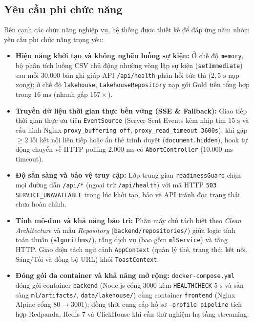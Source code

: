 \subsection{Yêu cầu phi chức năng}
\label{sec:nfr}
Bên cạnh các chức năng nghiệp vụ, hệ thống được thiết kế để đáp ứng năm nhóm yêu cầu phi chức năng trọng yếu:
\begin{itemize}[topsep=0pt, itemsep=1pt]
	\item \textbf{Hiệu năng khởi tạo và không nghẽn luồng sự kiện:} Ở chế độ \texttt{memory}, bộ phân tích luồng CSV chủ động nhường vòng lặp sự kiện (\texttt{setImmediate}) sau mỗi $30.000$ bản ghi giúp API \texttt{/api/health} phản hồi tức thì ($2{,}5\text{ s}$ nạp xong); ở chế độ \texttt{lakehouse}, \texttt{LakehouseRepository} nạp gói Gold tiền tổng hợp trong $16\text{ ms}$ (nhanh gấp $157\times$).
	\item \textbf{Truyền dữ liệu thời gian thực bền vững (SSE \& Fallback):} Giao tiếp thời gian thực ưu tiên \texttt{EventSource} (Server-Sent Events kèm nhịp tim $15\text{ s}$ và cấu hình Nginx \texttt{proxy_buffering off}, \texttt{proxy_read_timeout 3600s}); khi gặp $\ge 2$ lỗi kết nối liên tiếp hoặc ẩn thẻ trình duyệt (\texttt{document.hidden}), hook tự động chuyển về HTTP polling $2.000\text{ ms}$ có \texttt{AbortController} ($10.000\text{ ms}$ timeout).
	\item \textbf{Độ sẵn sàng và bảo vệ truy cập:} Lớp trung gian \texttt{readinessGuard} chặn mọi đường dẫn \texttt{/api/*} (ngoại trừ \texttt{/api/health}) với mã HTTP \texttt{503 SERVICE_UNAVAILABLE} trong lúc khởi tạo, bảo vệ API tránh đọc trạng thái chưa hoàn chỉnh.
	\item \textbf{Tính mô-đun và khả năng bảo trì:} Phần máy chủ tách biệt theo \textit{Clean Architecture} và mẫu \textit{Repository} (\texttt{backend/repositories/}) giữa logic tính toán thuần (\texttt{algorithms/}), tầng dịch vụ (bao gồm \texttt{mlService}) và tầng HTTP. Giao diện tách ngữ cảnh \texttt{AppContext} (quản lý thẻ, trạng thái kết nối, Sáng/Tối và đồng bộ URL) khỏi \texttt{ToastContext}.
	\item \textbf{Đóng gói đa container và khả năng mở rộng:} \texttt{docker-compose.yml} đóng gói container \texttt{backend} (Node.js cổng $3000$ kèm \texttt{HEALTHCHECK} $5\text{ s}$ và sẵn sàng \texttt{ml/artifacts/}, \texttt{data/lakehouse/}) cùng container \texttt{frontend} (Nginx Alpine cổng $80 \rightarrow 3001$); đồng thời cung cấp hồ sơ \texttt{--profile pipeline} tích hợp Redpanda, Redis $7$ và ClickHouse khi cần thử nghiệm hạ tầng streaming.
\end{itemize}

